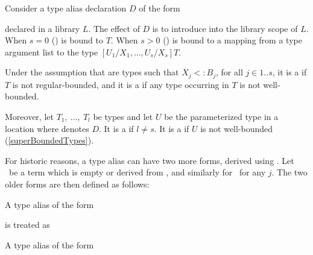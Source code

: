 \documentclass[makeidx]{article}
\begin{document}
{\LMHash{}%
Consider a type alias declaration $D$ of the form

\noindent
{}

\noindent
declared in a library $L$.
The effect of $D$ is to introduce \id{} into the library scope of $L$.
When $s = 0$
()
\id{} is bound to $T$.
When $s > 0$
()
\id{} is bound to a mapping from a type argument list
to the type
$[U_1/X_1, \ldots, U_s/X_s]T$.

\LMHash{}%
Under the assumption that  are types such that
$X_j <: B_j$, for all $j \in 1 .. s$,
it is a  if $T$ is not regular-bounded,
and it is a
 if any type occurring in $T$ is not well-bounded.


\LMHash{}%
Moreover,
let $T_1,\ \ldots,\ T_l$ be types
and let $U$ be the parameterized type 
in a location where \id{} denotes $D$.
It is a  if $l \not= s$.
It is a  if $U$ is not well-bounded
(\ref{superBoundedTypes}).

\LMHash{}%
For historic reasons, a type alias can have two more forms,
derived using .
Let \ be a term which is empty or derived from ,
and similarly for \ for any $j$.
The two older forms are then defined as follows:

\LMHash{}%
A type alias of the form

\noindent
{}

\noindent
{}

\noindent
is treated as

\noindent
\code{\TYPEDEF{} \id<\TypeParametersStd> =}

\noindent
{}

\LMHash{}%
A type alias of the form

}
\end{document}
